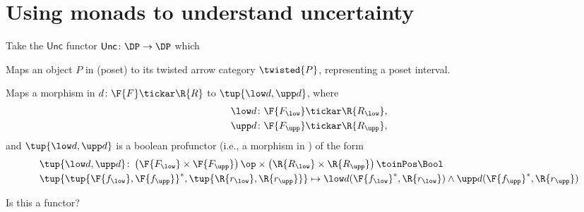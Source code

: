 \section{Using monads to understand uncertainty}

Take the $\mathsf{Unc}$ functor $\mathsf{Unc}\colon \DP\to \DP$ which
\begin{compactenum}
    \item Maps an object $P$ in \DP (poset) to its twisted arrow category $\twisted{P}$, representing a poset interval.
    \item Maps a morphism in \DP $d\colon \F{F}\tickar \R{R}$ to $\tup{\low d,\upp d}$, where
    \begin{equation}
    \begin{aligned}
        \low d\colon \F{F_{\low}}&\tickar \R{R_{\low}},\\
        \upp d\colon \F{F_{\upp}}&\tickar \R{R_{\upp}},
    \end{aligned}
    \end{equation}
    and $\tup{\low d,\upp d}$ is a boolean profunctor (i.e., a morphism in \DP) of the form
    \begin{equation}
    \begin{aligned}
        &\tup{\low d,\upp d}\colon \left(\F{F_{\low}}\times \F{F_{\upp}} \right)\op \times \left(\R{R_{\low}}\times \R{R_{\upp}} \right)\toinPos \Bool\\
        &\tup{\tup{\F{f_{\low}},\F{f_{\upp}}}^*,\tup{\R{r_{\low}},\R{r_{\upp}}}}\mapsto \low d(\F{f_{\low}}^*,\R{r_{\low}})\wedge \upp d(\F{f_{\upp}}^*,\R{r_{\upp}})
    \end{aligned}
    \end{equation}
\end{compactenum}

Is this a functor?

